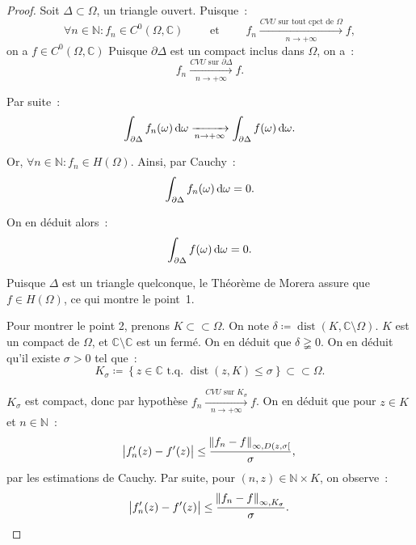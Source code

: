 \documentclass{report}
\theoremstyle{definition}
\theoremstyle{remark}
\numberwithin{equation}{section}
\newcommand{\C}{\mathbb C}
\newcommand{\N}{\mathbb N}
\newcommand{\tq}{\text{ t.q. }}
\DeclareMathOperator{\dist}{dist}
\newcommand{\CONV}[5]{\xrightarrow[#2 \to #3]{#4 \text{ #5 } #1}}
\newcommand{\CVU}[3]{\CONV{#1}{#2}{#3}{CVU}{sur}}
\newcommand{\CVUc}[3]{\CONV{#1}{#2}{#3}{CVU}{sur tout cpct de}}
\newcommand{\pinfty}{{+\infty}}
\newcommand{\subscpct}{\subset\subset}
\begin{document}
			\begin{proof} Soit $\Delta \subset \Omega$, un triangle ouvert. Puisque~:
			\begin{equation}
				\forall n \in \N : f_n \in C^0(\Omega, \C) \qquad \text{ et } \qquad f_n \CVUc \Omega n\pinfty f,
			\end{equation}
			on a $f \in C^0(\Omega, \C)$ Puisque $\partial \Delta$ est un compact inclus dans $\Omega$, on a~:
			\begin{equation}
				f_n \CVU {\partial \Delta} n\pinfty f.
			\end{equation}

			Par suite~:
			\begin{equation}
				\int_{\partial \Delta}f_n(\omega)\dif\omega \xrightarrow[n \to \pinfty]{} \int_{\partial \Delta}f(\omega)\dif \omega.
			\end{equation}

			Or, $\forall n \in \N : f_n \in H(\Omega)$. Ainsi, par Cauchy~:
			\begin{equation}
				\int_{\partial \Delta}f_n(\omega)\dif \omega = 0.
			\end{equation}

			On en déduit alors~:
			\begin{equation}
				\int_{\partial \Delta} f(\omega)\dif \omega = 0.
			\end{equation}

			Puisque $\Delta$ est un triangle quelconque, le Théorème de Morera assure que $f \in H(\Omega)$, ce qui montre le point~1.

			Pour montrer le point 2, prenons $K \subscpct \Omega$. On note $\delta \coloneqq \dist(K, \C \setminus \Omega)$. $K$ est un compact
			de $\Omega$, et $\C \setminus \C$ est un fermé. On en déduit que $\delta \gneqq 0$. On en déduit qu'il existe $\sigma > 0$ tel que~:
			\begin{equation}
				K_\sigma \coloneqq \left\{z \in \C \tq \dist(z, K) \leq \sigma\right\} \subscpct \Omega.
			\end{equation}

			$K_\sigma$ est compact, donc par hypothèse $f_n \CVU {K_\sigma} n\pinfty f$. On en déduit que pour $z \in K$ et $n \in \N$~:
			\begin{equation}
				\abs {f_n'(z)-f'(z)} \leq \frac {\norm {f_n-f}_{\infty,D(z, \sigma[}}{\sigma},
			\end{equation}
			par les estimations de Cauchy. Par suite, pour $(n, z) \in \N \times K$, on observe~:
			\begin{equation}
				\abs {f_n'(z)-f'(z)} \leq \frac {\norm {f_n-f}_{\infty, K_\sigma}}\sigma.
			\end{equation}


\end{proof}
\end{document}
